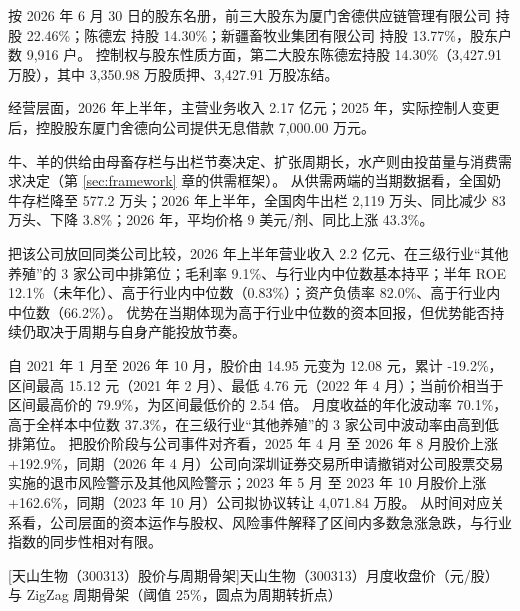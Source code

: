  按 2026 年 6 月 30 日的股东名册，前三大股东为厦门舍德供应链管理有限公司 持股 22.46\%；陈德宏 持股 14.30\%；新疆畜牧业集团有限公司 持股 13.77\%，股东户数 9,916 户。 控制权与股东性质方面，第二大股东陈德宏持股 14.30\%（3,427.91 万股），其中 3,350.98 万股质押、3,427.91 万股冻结。

 经营层面，2026 年上半年，主营业务收入 2.17 亿元；2025 年，实际控制人变更后，控股股东厦门舍德向公司提供无息借款 7,000.00 万元。

 牛、羊的供给由母畜存栏与出栏节奏决定、扩张周期长，水产则由投苗量与消费需求决定（第 \ref{sec:framework} 章的供需框架）。 从供需两端的当期数据看，全国奶牛存栏降至 577.2 万头；2026 年上半年，全国肉牛出栏 2,119 万头、同比减少 83 万头、下降 3.8\%；2026 年，平均价格 9 美元/剂、同比上涨 43.3\%。

 把该公司放回同类公司比较，2026 年上半年营业收入 2.2 亿元、在三级行业“其他养殖”的 3 家公司中排第位；毛利率 9.1\%、与行业内中位数基本持平；半年 ROE 12.1\%（未年化）、高于行业内中位数（0.83\%）；资产负债率 82.0\%、高于行业内中位数（66.2\%）。 优势在当期体现为高于行业中位数的资本回报，但优势能否持续仍取决于周期与自身产能投放节奏。

 自 2021 年 1 月至 2026 年 10 月，股价由 14.95 元变为 12.08 元，累计 -19.2\%，区间最高 15.12 元（2021 年 2 月）、最低 4.76 元（2022 年 4 月）；当前价相当于区间最高价的 79.9\%，为区间最低价的 2.54 倍。 月度收益的年化波动率 70.1\%，高于全样本中位数 37.3\%，在三级行业“其他养殖”的 3 家公司中波动率由高到低排第位。 把股价阶段与公司事件对齐看，2025 年 4 月 至 2026 年 8 月股价上涨+192.9\%，同期（2026 年 4 月）公司向深圳证券交易所申请撤销对公司股票交易实施的退市风险警示及其他风险警示；2023 年 5 月 至 2023 年 10 月股价上涨+162.6\%，同期（2023 年 10 月）公司拟协议转让 4,071.84 万股。 从时间对应关系看，公司层面的资本运作与股权、风险事件解释了区间内多数急涨急跌，与行业指数的同步性相对有限。

\begin{center}
\begin{minipage}{\textwidth}\centering
{}

[天山生物（300313）股价与周期骨架]{天山生物（300313）月度收盘价（元/股）与 ZigZag 周期骨架（阈值 25\%，圆点为周期转折点）}
\end{minipage}
\end{center}

